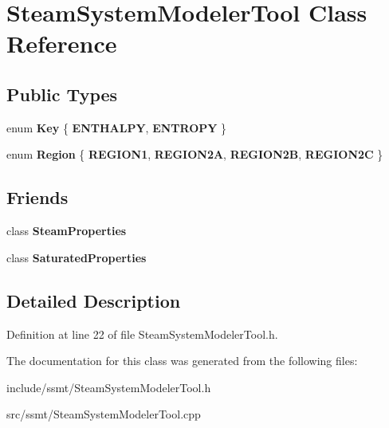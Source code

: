 \hypertarget{class_steam_system_modeler_tool}{}\section{Steam\+System\+Modeler\+Tool Class Reference}
\label{class_steam_system_modeler_tool}
\subsection*{Public Types}
\begin{DoxyCompactItemize}
\item 
\mbox{\label{class_steam_system_modeler_tool_aed38516c350ca4ecf17b545e07d41dcd}} 
enum {\bfseries Key} \{ {\bfseries E\+N\+T\+H\+A\+L\+PY}, 
{\bfseries E\+N\+T\+R\+O\+PY}
 \}
\item 
\mbox{\label{class_steam_system_modeler_tool_a162eeadc7eb56a9b50b7a8f630eb8f05}} 
enum {\bfseries Region} \{ {\bfseries R\+E\+G\+I\+O\+N1}, 
{\bfseries R\+E\+G\+I\+O\+N2A}, 
{\bfseries R\+E\+G\+I\+O\+N2B}, 
{\bfseries R\+E\+G\+I\+O\+N2C}
 \}
\end{DoxyCompactItemize}
\subsection*{Friends}
\begin{DoxyCompactItemize}
\item 
\mbox{\label{class_steam_system_modeler_tool_a7b6c56e04b76b2d946235064998e84c9}} 
class {\bfseries Steam\+Properties}
\item 
\mbox{\label{class_steam_system_modeler_tool_a43a03ec32145468365cf841d9310263c}} 
class {\bfseries Saturated\+Properties}
\end{DoxyCompactItemize}


\subsection{Detailed Description}


Definition at line 22 of file Steam\+System\+Modeler\+Tool.\+h.



The documentation for this class was generated from the following files\+:\begin{DoxyCompactItemize}
\item 
include/ssmt/Steam\+System\+Modeler\+Tool.\+h\item 
src/ssmt/Steam\+System\+Modeler\+Tool.\+cpp\end{DoxyCompactItemize}

